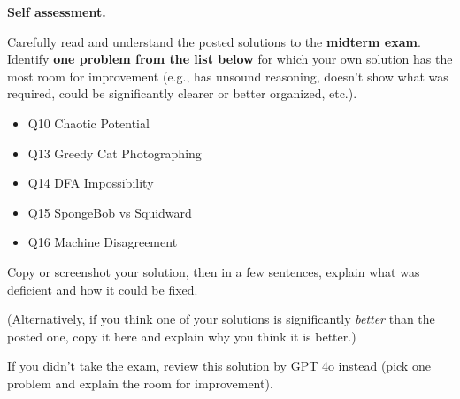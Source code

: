 \documentclass[11pt,addpoints,answers]{exam}
\begin{document}
\begin{questions}

  \question[10] \textbf{Self assessment.} \nopagebreak
  
  Carefully read and understand the posted solutions to the \textbf{midterm exam}. Identify \textbf{one problem from the list below} for which your own solution has the most room for improvement (e.g., has unsound reasoning, doesn’t show what was required, could be significantly clearer or better organized, etc.).
  \begin{itemize}
      \item Q10 Chaotic Potential
      \item Q13 Greedy Cat Photographing
      \item Q14 DFA Impossibility
      \item Q15 SpongeBob vs Squidward
      \item Q16 Machine Disagreement
  \end{itemize}
  Copy or screenshot your solution, then in a few sentences, explain what was deficient and how it could be fixed.

  (Alternatively, if you think one of your solutions is significantly \emph{better} than the posted one, copy it here and explain why you think it is better.)

  If you didn't take the exam, review \href{https://drive.google.com/file/d/1cky3dbWYKLzPwVmNGsx5TeEW42zbEdBa/view?usp=drive_link}{this solution} by GPT 4o instead (pick one problem and explain the room for improvement). 


\end{questions}
\end{document}
